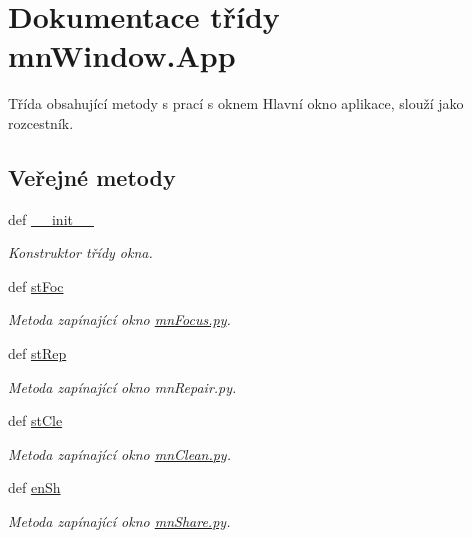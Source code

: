 \hypertarget{classmnWindow_1_1App}{\section{Dokumentace třídy mn\-Window.\-App}
\label{d4/d8e/classmnWindow_1_1App}
}


Třída obsahující metody s prací s oknem Hlavní okno aplikace, slouží jako rozcestník.  


\subsection*{Veřejné metody}
\begin{DoxyCompactItemize}
\item 
def \hyperlink{classmnWindow_1_1App_ab0d57eebcf6c963177340604c8aa783a}{\-\_\-\-\_\-init\-\_\-\-\_\-}
\begin{DoxyCompactList}\small\item\em Konstruktor třídy okna. \end{DoxyCompactList}\item 
def \hyperlink{classmnWindow_1_1App_ab4ef24c1346b73a656accc797f8efbf8}{st\-Foc}
\begin{DoxyCompactList}\small\item\em Metoda zapínající okno \hyperlink{mnFocus_8py}{mn\-Focus.\-py}. \end{DoxyCompactList}\item 
def \hyperlink{classmnWindow_1_1App_ae1a8f341e8aad4f86fe54ad373b4c923}{st\-Rep}
\begin{DoxyCompactList}\small\item\em Metoda zapínající okno mn\-Repair.\-py. \end{DoxyCompactList}\item 
def \hyperlink{classmnWindow_1_1App_adc58e827583658bb4a0ffa7289c53b83}{st\-Cle}
\begin{DoxyCompactList}\small\item\em Metoda zapínající okno \hyperlink{mnClean_8py}{mn\-Clean.\-py}. \end{DoxyCompactList}\item 
def \hyperlink{classmnWindow_1_1App_a86cbf46093e06025be84feab1d5b817a}{en\-Sh}
\begin{DoxyCompactList}\small\item\em Metoda zapínající okno \hyperlink{mnShare_8py}{mn\-Share.\-py}. \end{DoxyCompactList}\item 

\end{DoxyCompactItemize}
